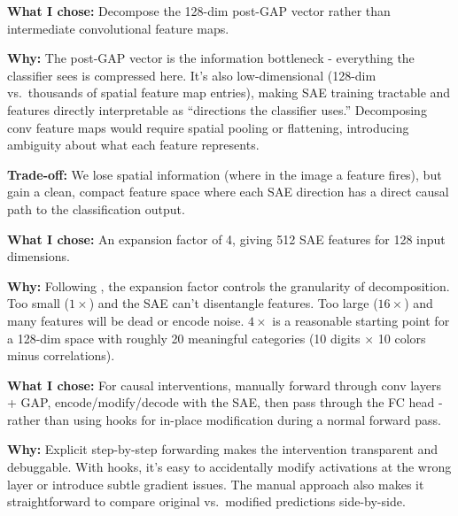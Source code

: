\documentclass[9pt,a4paper,twocolumn,twoside]{tau-class/tau}
\begin{document}
        \begin{tauenv}[frametitle={Decision: Post-GAP Hidden State, Not Intermediate Conv Features}]
            \textbf{What I chose:} Decompose the 128-dim post-GAP vector rather than intermediate convolutional feature maps.

            \textbf{Why:} The post-GAP vector is the information bottleneck - everything the classifier sees is compressed here. It's also low-dimensional (128-dim vs.\ thousands of spatial feature map entries), making SAE training tractable and features directly interpretable as ``directions the classifier uses.'' Decomposing conv feature maps would require spatial pooling or flattening, introducing ambiguity about what each feature represents.

            \textbf{Trade-off:} We lose spatial information (where in the image a feature fires), but gain a clean, compact feature space where each SAE direction has a direct causal path to the classification output.
        \end{tauenv}

        \begin{tauenv}[frametitle={Decision: $4\times$ Expansion Factor (128 $\rightarrow$ 512)}]
            \textbf{What I chose:} An expansion factor of 4, giving 512 SAE features for 128 input dimensions.

            \textbf{Why:} Following \cite{cunningham2023sparse}, the expansion factor controls the granularity of decomposition. Too small ($1\times$) and the SAE can't disentangle features. Too large ($16\times$) and many features will be dead or encode noise. $4\times$ is a reasonable starting point for a 128-dim space with roughly 20 meaningful categories (10 digits $\times$ 10 colors minus correlations).
        \end{tauenv}

        \begin{tauenv}[frametitle={Decision: Manual Step-by-Step Intervention, Not Hook-Based}]
            \textbf{What I chose:} For causal interventions, manually forward through conv layers + GAP, encode/modify/decode with the SAE, then pass through the FC head - rather than using hooks for in-place modification during a normal forward pass.

            \textbf{Why:} Explicit step-by-step forwarding makes the intervention transparent and debuggable. With hooks, it's easy to accidentally modify activations at the wrong layer or introduce subtle gradient issues. The manual approach also makes it straightforward to compare original vs.\ modified predictions side-by-side.
        \end{tauenv}
\end{document}
